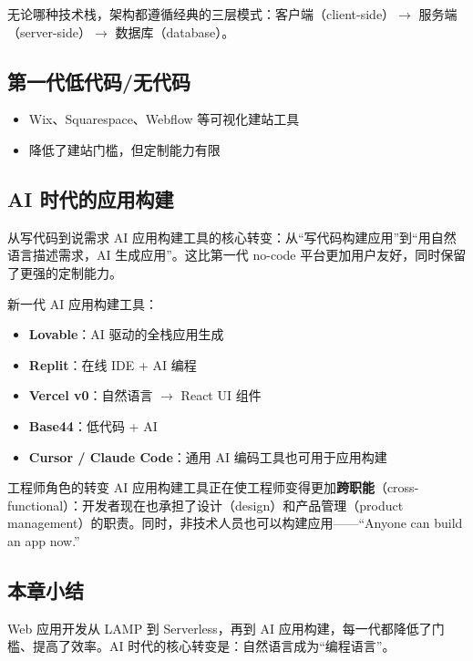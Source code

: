 \documentclass[a4paper]{article}
\begin{document}
无论哪种技术栈，架构都遵循经典的三层模式：客户端（client-side）$\rightarrow$ 服务端（server-side）$\rightarrow$ 数据库（database）。

\subsection{第一代低代码/无代码}

\begin{itemize}
    \item Wix、Squarespace、Webflow 等可视化建站工具
    \item 降低了建站门槛，但定制能力有限
\end{itemize}

\subsection{AI 时代的应用构建}

\begin{importantbox}{从写代码到说需求}
AI 应用构建工具的核心转变：从``写代码构建应用''到``用自然语言描述需求，AI 生成应用''。这比第一代 no-code 平台更加用户友好，同时保留了更强的定制能力。
\end{importantbox}

新一代 AI 应用构建工具：
\begin{itemize}
    \item \textbf{Lovable}：AI 驱动的全栈应用生成
    \item \textbf{Replit}：在线 IDE + AI 编程
    \item \textbf{Vercel v0}：自然语言 $\rightarrow$ React UI 组件
    \item \textbf{Base44}：低代码 + AI
    \item \textbf{Cursor / Claude Code}：通用 AI 编码工具也可用于应用构建
\end{itemize}

\begin{knowledgebox}{工程师角色的转变}
AI 应用构建工具正在使工程师变得更加\textbf{跨职能}（cross-functional）：开发者现在也承担了设计（design）和产品管理（product management）的职责。同时，非技术人员也可以构建应用——``Anyone can build an app now.''
\end{knowledgebox}

\subsection{本章小结}

Web 应用开发从 LAMP 到 Serverless，再到 AI 应用构建，每一代都降低了门槛、提高了效率。AI 时代的核心转变是：自然语言成为``编程语言''。
\end{document}
